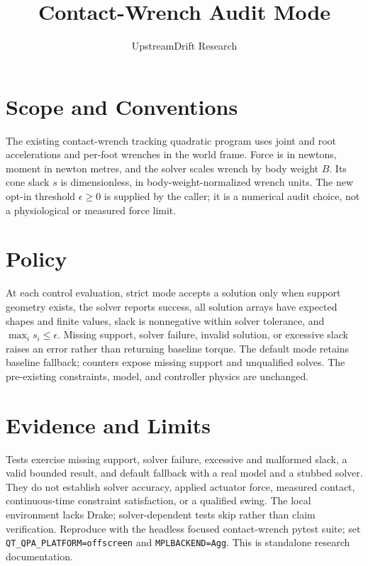 \documentclass{article}
\title{Contact-Wrench Audit Mode}
\author{UpstreamDrift Research}
\date{}
\begin{document}
\maketitle
\section{Scope and Conventions}
The existing contact-wrench tracking quadratic program uses joint and root
accelerations and per-foot wrenches in the world frame. Force is in newtons,
moment in newton metres, and the solver scales wrench by body weight $B$.
Its cone slack $s$ is dimensionless, in body-weight-normalized wrench units.
The new opt-in threshold $\epsilon\geq0$ is supplied by the caller; it is a
numerical audit choice, not a physiological or measured force limit.
\section{Policy}
At each control evaluation, strict mode accepts a solution only when support
geometry exists, the solver reports success, all solution arrays have expected
shapes and finite values, slack is nonnegative within solver tolerance, and
$\max_i s_i\leq\epsilon$. Missing support, solver failure, invalid solution,
or excessive slack raises an error rather than returning baseline torque.
The default mode retains baseline fallback; counters expose missing support
and unqualified solves. The pre-existing constraints, model, and controller
physics are unchanged.
\section{Evidence and Limits}
Tests exercise missing support, solver failure, excessive and malformed slack,
a valid bounded result, and default fallback with a real model and a stubbed
solver. They do not establish solver accuracy, applied actuator force,
measured contact, continuous-time constraint satisfaction, or a qualified
swing. The local environment lacks Drake; solver-dependent tests skip rather
than claim verification. Reproduce with the headless focused contact-wrench
pytest suite; set \texttt{QT\_QPA\_PLATFORM=offscreen} and
\texttt{MPLBACKEND=Agg}. This is standalone research documentation.
\end{document}
